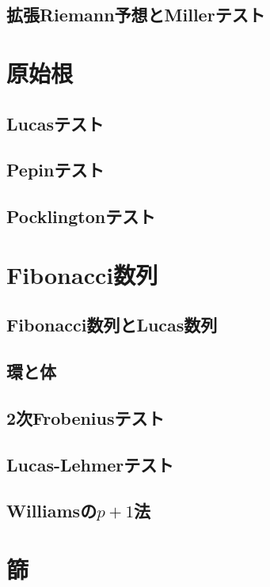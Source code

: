 \subsection{拡張Riemann予想とMillerテスト}


\section{原始根}
\subsection{Lucasテスト}

\subsection{Pepinテスト}

\subsection{Pocklingtonテスト}


\section{Fibonacci数列}
\subsection{Fibonacci数列とLucas数列}

\subsection{環と体}

\subsection{2次Frobeniusテスト}

\subsection{Lucas-Lehmerテスト}

\subsection{Williamsの$p+1$法}


\section{篩}
